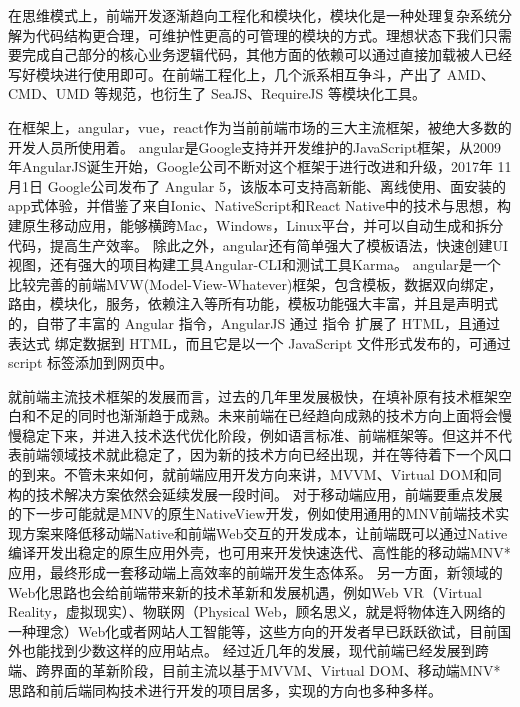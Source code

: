 	在思维模式上，前端开发逐渐趋向工程化和模块化，模块化是一种处理复杂系统分解为代码结构更合理，可维护性更高的可管理的模块的方式。理想状态下我们只需要完成自己部分的核心业务逻辑代码，其他方面的依赖可以通过直接加载被人已经写好模块进行使用即可。在前端工程化上，几个派系相互争斗，产出了 AMD、CMD、UMD 等规范，也衍生了 SeaJS、RequireJS 等模块化工具。

	在框架上，angular，vue，react作为当前前端市场的三大主流框架，被绝大多数的开发人员所使用着。
	angular是Google支持并开发维护的JavaScript框架，从2009年AngularJS诞生开始，Google公司不断对这个框架于进行改进和升级，2017年 11月1日 Google公司发布了 Angular 5，该版本可支持高新能、离线使用、面安装的app式体验，并借鉴了来自Ionic、NativeScript和React Native中的技术与思想，构建原生移动应用，能够横跨Mac，Windows，Linux平台，并可以自动生成和拆分代码，提高生产效率。
	除此之外，angular还有简单强大了模板语法，快速创建UI视图，还有强大的项目构建工具Angular-CLI和测试工具Karma。
	angular是一个比较完善的前端MVW(Model-View-Whatever)框架，包含模板，数据双向绑定，路由，模块化，服务，依赖注入等所有功能，模板功能强大丰富，并且是声明式的，自带了丰富的 Angular 指令，AngularJS 通过 指令 扩展了 HTML，且通过 表达式 绑定数据到 HTML，而且它是以一个 JavaScript 文件形式发布的，可通过 script 标签添加到网页中。
	
	就前端主流技术框架的发展而言，过去的几年里发展极快，在填补原有技术框架空白和不足的同时也渐渐趋于成熟。未来前端在已经趋向成熟的技术方向上面将会慢慢稳定下来，并进入技术迭代优化阶段，例如语言标准、前端框架等。但这并不代表前端领域技术就此稳定了，因为新的技术方向已经出现，并在等待着下一个风口的到来。不管未来如何，就前端应用开发方向来讲，MVVM、Virtual DOM和同构的技术解决方案依然会延续发展一段时间。
	对于移动端应用，前端要重点发展的下一步可能就是MNV的原生NativeView开发，例如使用通用的MNV前端技术实现方案来降低移动端Native和前端Web交互的开发成本，让前端既可以通过Native编译开发出稳定的原生应用外壳，也可用来开发快速迭代、高性能的移动端MNV*应用，最终形成一套移动端上高效率的前端开发生态体系。
	另一方面，新领域的Web化思路也会给前端带来新的技术革新和发展机遇，例如Web VR（Virtual Reality，虚拟现实）、物联网（Physical Web，顾名思义，就是将物体连入网络的一种理念）Web化或者网站人工智能等，这些方向的开发者早已跃跃欲试，目前国外也能找到少数这样的应用站点\cite{2017FE}。
	经过近几年的发展，现代前端已经发展到跨端、跨界面的革新阶段，目前主流以基于MVVM、Virtual DOM、移动端MNV*思路和前后端同构技术进行开发的项目居多，实现的方向也多种多样。

